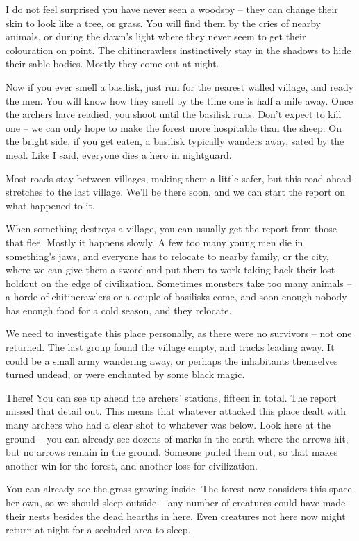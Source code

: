\begin{multicols}{2}
\begin{exampletext}
	I do not feel surprised you have never seen a woodspy -- they can change their skin to look like a tree, or grass.
	You will find them by the cries of nearby animals, or during the dawn's light where they never seem to get their colouration on point.
	The chitincrawlers instinctively stay in the shadows to hide their sable bodies.
	Mostly they come out at night.

	Now if you ever smell a basilisk, just run for the nearest walled village, and ready the men.
	You will know how they smell by the time one is half a mile away.
	Once the archers have readied, you shoot until the basilisk runs.
	Don't expect to kill one -- we can only hope to make the forest more hospitable than the sheep.
	On the bright side, if you get eaten, a basilisk typically wanders away, sated by the meal.
	Like I said, everyone dies a hero in \gls{nightguard}.

	Most roads stay between villages, making them a little safer, but this road ahead stretches to the last village.
	We'll be there soon, and we can start the report on what happened to it.

	When something destroys a village, you can usually get the report from those that flee.
	Mostly it happens slowly.
	A few too many young men die in something's jaws, and everyone has to relocate to nearby family, or the city, where we can give them a sword and put them to work taking back their lost holdout on the edge of civilization.
	Sometimes monsters take too many animals -- a horde of chitincrawlers or a couple of basilisks come, and soon enough nobody has enough food for a cold season, and they relocate.

	We need to investigate this place personally, as there were no survivors -- not one returned.
	The last group found the village empty, and tracks leading away.
	It could be a small army wandering away, or perhaps the inhabitants themselves turned undead, or were enchanted by some black magic.

	There! You can see up ahead the archers' stations, fifteen in total.
	The report missed that detail out.
	This means that whatever attacked this place dealt with many archers who had a clear shot to whatever was below.
	Look here at the ground -- you can already see dozens of marks in the earth where the arrows hit, but no arrows remain in the ground.
	Someone pulled them out, so that makes another win for the forest, and another loss for civilization.

	You can already see the grass growing inside.
	The forest now considers this space her own, so we should sleep outside -- any number of creatures could have made their nests besides the dead hearths in here.
	Even creatures not here now might return at night for a secluded area to sleep.


\end{exampletext}
\end{multicols}
